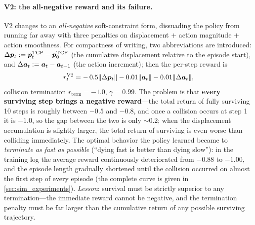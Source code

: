 \paragraph{V2: the all-negative reward and its failure.} V2 changes to an \emph{all-negative} soft-constraint form, dissuading the policy from running far away with three penalties on displacement $+$ action magnitude $+$ action smoothness. For compactness of writing, two abbreviations are introduced: $\Delta\bm{p}_t := \bm{p}_t^{\text{TCP}} - \bm{p}_0^{\text{TCP}}$ (the cumulative displacement relative to the episode start), and $\Delta\bm{a}_t := \bm{a}_t - \bm{a}_{t-1}$ (the action increment); then the per-step reward is
\begin{equation*}
  r_t^{\text{V2}} = -\, 0.5 \lVert\Delta\bm{p}_t\rVert - 0.01 \lVert\bm{a}_t\rVert - 0.01 \lVert\Delta\bm{a}_t\rVert,
\end{equation*}
collision termination $r_{\text{term}} = -1.0$, $\gamma = 0.99$. The problem is that \textbf{every surviving step brings a negative reward}---the total return of fully surviving 10 steps is roughly between $-0.5$ and $-0.8$, and once a collision occurs at step 1 it is $-1.0$, so the gap between the two is only $\sim 0.2$; when the displacement accumulation is slightly larger, the total return of surviving is even worse than colliding immediately. The optimal behavior the policy learned became to \emph{terminate as fast as possible} (``dying fast is better than dying slow''): in the training log the average reward continuously deteriorated from $-0.88$ to $-1.00$, and the episode length gradually shortened until the collision occurred on almost the first step of every episode (the complete curve is given in \cref{sec:sim_experiments}). \emph{Lesson}: survival must be strictly superior to any termination---the immediate reward cannot be negative, and the termination penalty must be far larger than the cumulative return of any possible surviving trajectory.

